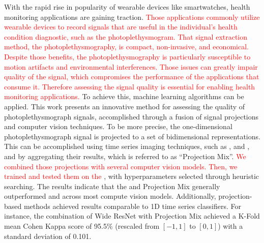 
With the rapid rise in popularity of wearable devices like smartwatches, health monitoring applications are gaining traction. 
\textcolor{red}{Those applications commonly utilize wearable devices to record signals that are useful in the individual's health condition diagnostic, such as the photoplethysmogram. That signal extraction method, the photoplethysmography, is compact, non-invasive, and economical. Despite those benefits, the photoplethysmography is particularly susceptible to motion artifacts and environmental interferences. Those issues can greatly impair quality of the signal, which compromises the performance of the applications that consume it. Therefore  assessing the signal quality is essential for enabling health monitoring applications. }
%
To achieve this, machine learning algorithms can be applied. This work presents an innovative method for assessing the quality of photoplethysmograph signals, accomplished through a fusion of signal projections and computer vision techniques. To be more precise, the one-dimensional photoplethysmograph signal is projected to a set of bidimensional representations. This can be accomplished using time series imaging techniques, such as ,  and , and by aggregating their results, which is referred to as ``Projection Mix''. \textcolor{red}{We combined those projections with several computer vision models. Then, we trained and tested them on the }, with hyperparameters selected through heuristic searching. The results indicate that the  and Projection Mix generally outperformed  and  across most compute vision models. Additionally, projection-based methods achieved results comparable to 1D time series classifiers. For instance, the combination of Wide ResNet with Projection Mix achieved a K-Fold mean Cohen Kappa score of 95.5\% (rescaled from $[-1,1]$ to $[0,1]$) with a standard deviation of 0.101. 
